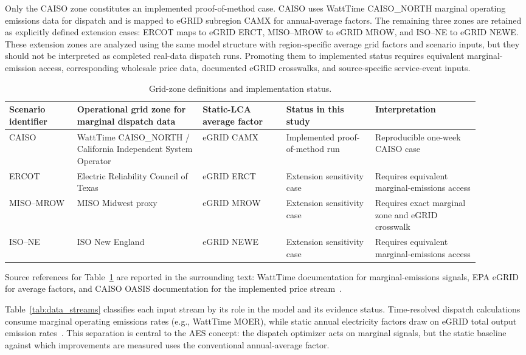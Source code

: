\documentclass[cleantechnol,article,submit,pdftex,moreauthors]{Definitions/mdpi}
\begin{document}
Only the CAISO zone constitutes an implemented proof-of-method case. CAISO uses WattTime CAISO\_NORTH marginal operating emissions data for dispatch and is mapped to eGRID subregion CAMX for annual-average factors. The remaining three zones are retained as explicitly defined extension cases: ERCOT maps to eGRID ERCT, MISO--MROW to eGRID MROW, and ISO--NE to eGRID NEWE. These extension zones are analyzed using the same model structure with region-specific average grid factors and scenario inputs, but they should not be interpreted as completed real-data dispatch runs. Promoting them to implemented status requires equivalent marginal-emission access, corresponding wholesale price data, documented eGRID crosswalks, and source-specific service-event inputs.

\begin{table}[htbp]
	\centering
	\caption{Grid-zone definitions and implementation status.}
	\label{tab:grid_zone_crosswalk}
	\scriptsize
	\begin{tabular}{p{0.13\linewidth}p{0.24\linewidth}p{0.16\linewidth}p{0.17\linewidth}p{0.20\linewidth}}
		\toprule
		Scenario identifier & Operational grid zone for marginal dispatch data & Static-LCA average factor & Status in this study & Interpretation \\
		\midrule
		CAISO & WattTime CAISO\_NORTH / California Independent System Operator & eGRID CAMX & Implemented proof-of-method run & Reproducible one-week CAISO case \\
		ERCOT & Electric Reliability Council of Texas & eGRID ERCT & Extension sensitivity case & Requires equivalent marginal-emissions access \\
		MISO--MROW & MISO Midwest proxy & eGRID MROW & Extension sensitivity case & Requires exact marginal zone and eGRID crosswalk \\
		ISO--NE & ISO New England & eGRID NEWE & Extension sensitivity case & Requires equivalent marginal-emissions access \\
		\bottomrule
	\end{tabular}
\end{table}

\noindent Source references for Table~\ref{tab:grid_zone_crosswalk} are reported in the surrounding text: WattTime documentation for marginal-emissions signals, EPA eGRID for average factors, and CAISO OASIS documentation for the implemented price stream~\cite{WattTimeMOER,EPAeGRID2023,CAISOOASISAPI,CAISOOASISFAQ}.

Table~\ref{tab:data_streams} classifies each input stream by its role in the model and its evidence status. Time-resolved dispatch calculations consume marginal operating emissions rates (e.g., WattTime MOER), while static annual electricity factors draw on eGRID total output emission rates~\cite{WattTimeMOER,EPAeGRID2023}. This separation is central to the AES concept: the dispatch optimizer acts on marginal signals, but the static baseline against which improvements are measured uses the conventional annual-average factor.
\end{document}
